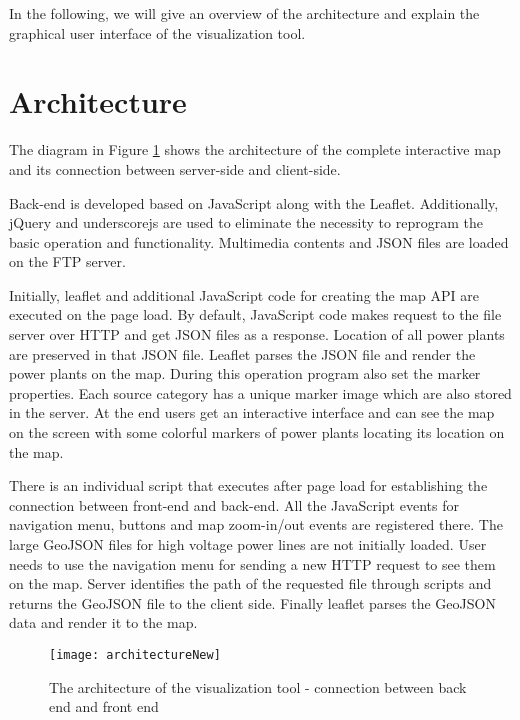 In the following, we will give an overview of the architecture and explain the graphical user interface of the visualization tool.

\section{Architecture}
\label{sec:architecture}

The diagram in Figure \ref{fig:architecture} shows the architecture of the complete interactive map and its connection between server-side and client-side. 

Back-end is developed based on JavaScript along with the Leaflet. Additionally, jQuery and underscorejs are used to eliminate the necessity to reprogram the basic operation and functionality. Multimedia contents and JSON files are loaded on the FTP server. 

Initially, leaflet and additional JavaScript code for creating the map API are executed on the page load. By default, JavaScript code makes request to the file server over HTTP and get JSON files as a response. Location of all power plants are preserved in that JSON file. Leaflet parses the JSON file and render the power plants on the map. During this operation program also set the marker properties. Each source category has a unique marker image which are also stored in the server. At the end users get an interactive interface and can see the map on the screen with some colorful markers of power plants locating its location on the map. 

There is an individual script that executes after page load for establishing the connection between front-end and back-end. All the JavaScript events for navigation menu, buttons and map zoom-in/out events are registered there. The large GeoJSON files for high voltage power lines are not initially loaded. User needs to use the navigation menu for sending a new HTTP request to see them on the map. Server identifies the path of the requested file through scripts and returns the GeoJSON file to the client side. Finally leaflet parses the GeoJSON data and render it to the map.


\begin{figure}
  \begin{center}
    \texttt{[image: architectureNew]}
    \caption[The architecture of the visualization tool]{The architecture of the visualization tool - connection between back end and front end}
    \label{fig:architecture}
  \end{center}
\end{figure} 


